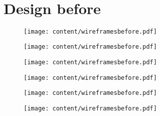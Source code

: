 \newpage
~\newpage
\section{Design before}
\label{appendix:a}
\begin{figure}[H]
\texttt{[image: content/wireframesbefore.pdf]}
\end{figure}
\begin{figure}[H]
\texttt{[image: content/wireframesbefore.pdf]}
\end{figure}
\begin{figure}[H]
\texttt{[image: content/wireframesbefore.pdf]}
\end{figure}
\begin{figure}[H]
\texttt{[image: content/wireframesbefore.pdf]}
\end{figure}
\begin{figure}[H]
\texttt{[image: content/wireframesbefore.pdf]}
\end{figure}
\begin{figure}[H]
\texttt{[image: content/wireframesbefore.pdf]}
\end{figure}
